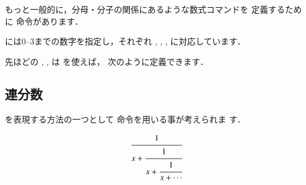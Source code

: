 
もっと一般的に，分母・分子の関係にあるような数式コマンドを
定義するために 命令があります．
\begin{usage}
\end{usage}

には0--3までの数字を指定し，それぞれ
, 
, 
, 
に対応しています．

先ほどの , ,  は を使えば，
次のように定義できます．

\begin{intext}
\newcommand\frac[2]{\genfrac{}{}{}{}{#1}{#2}}
\newcommand\tfrac[2]{\genfrac{}{}{}{1}{#1}{#2}}
\newcommand\binom[2]{\genfrac{(}{)}{0pt}{}{#1}{#2}}
\end{intext}

\subsection{連分数}

を表現する方法の一つとして 命令を用いる事が考えられま
す．

\begin{inout}
\begin{displaymath}
  \cfrac{1}{x+
    \cfrac{1}{x+
      \cfrac{1}{x+\dotsb}
    }
  }
\end{displaymath}
\end{inout}



